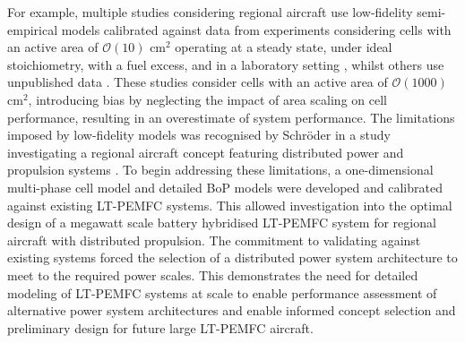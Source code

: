 For example, multiple studies considering regional aircraft use low-fidelity semi-empirical models calibrated against data from experiments considering cells with an active area of $\mathcal{O}(10)$ cm$^2$ operating at a steady state, under ideal stoichiometry, with a fuel excess, and in a laboratory setting \cite{chiaramassaroOptimalDesignHydrogenpowered2024a, schmelcherHydrogenFuelCells2022a}, whilst others use unpublished data \cite{sparanoFutureTechnologicalPotential2023a}. %
These studies consider cells with an active area of $\mathcal{O}(1000)$ cm$^2$, introducing bias by neglecting the impact of area scaling on cell performance, resulting in an overestimate of system performance.
The limitations imposed by low-fidelity models was recognised by Schr\"oder \etal in a study investigating a regional aircraft concept featuring distributed power and propulsion systems \cite{schroderOptimalDesignProton2024}.
To begin addressing these limitations, a one-dimensional multi-phase cell model and detailed BoP models were developed and calibrated against existing LT-PEMFC systems.
This allowed investigation into the optimal design of a megawatt scale battery hybridised LT-PEMFC system for regional aircraft with distributed propulsion.
The commitment to validating against existing systems forced the selection of a distributed power system architecture to meet to the required power scales.
This demonstrates the need for detailed modeling of LT-PEMFC systems at scale to enable performance assessment of alternative power system architectures and enable informed concept selection and preliminary design for future large LT-PEMFC aircraft.
